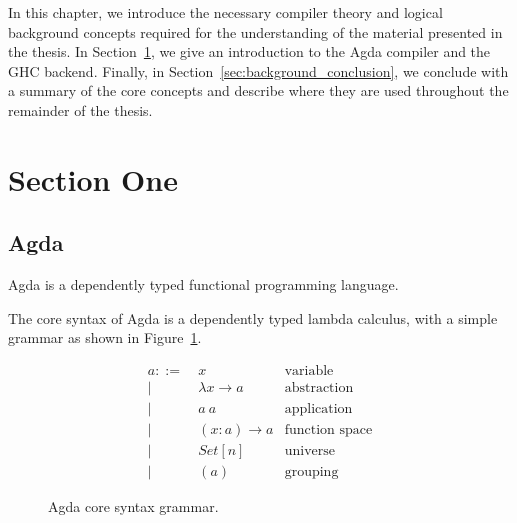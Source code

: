 

In this chapter, we introduce the necessary compiler theory and logical background concepts required for the understanding of the material presented in the thesis. In Section~\ref{sec:section_one}, we give an introduction to the Agda compiler and the GHC backend. Finally, in Section~\ref{sec:background_conclusion}, we conclude with a summary of the core concepts and describe where they are used throughout the remainder of the thesis.


\section{Section One}
\label{sec:section_one}

\subsection{Agda}

Agda is a dependently typed functional programming language.



The core syntax of Agda is a dependently typed lambda calculus, with a simple grammar as shown in Figure~\ref{fig:grammar}.

\begin{figure}
\begin{align*}
a ::=~& x               & \text{variable}\\
    |~& \lambda x \to a & \text{abstraction}\\
    |~& a~a             & \text{application}\\
    |~& (x : a) \to a   & \text{function space}\\
    |~& Set[n]          & \text{universe}\\
    |~& (a)             & \text{grouping}
\end{align*}
\caption{Agda core syntax grammar.\cite{agdawiki}}
\label{fig:grammar}
\end{figure}

